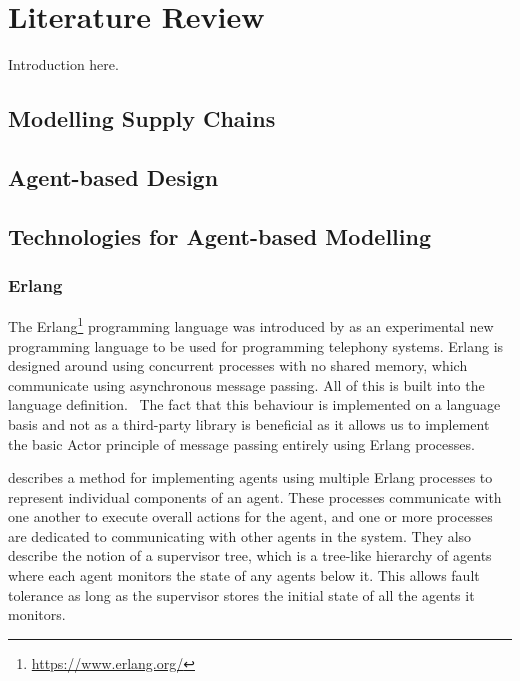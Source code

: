 \section{Literature Review}

Introduction here.

\subsection{Modelling Supply Chains}

\subsection{Agent-based Design}

\subsection{Technologies for Agent-based Modelling}

\subsubsection{Erlang}

The Erlang\footnote{\url{https://www.erlang.org/}} programming language was introduced by  as an experimental new programming language to be used for programming telephony systems.
Erlang is designed around using concurrent processes with no shared memory, which communicate using asynchronous message passing.
All of this is built into the language definition.~\cite{armstrong2007history}
The fact that this behaviour is implemented on a language basis and not as a third-party library is beneficial as it allows us to implement the basic Actor principle of message passing entirely using Erlang processes.

 describes a method for implementing agents using multiple Erlang processes to represent individual components of an agent.
These processes communicate with one another to execute overall actions for the agent, and one or more processes are dedicated to communicating with other agents in the system.
They also describe the notion of a supervisor tree, which is a tree-like hierarchy of agents where each agent monitors the state of any agents below it.
This allows fault tolerance as long as the supervisor stores the initial state of all the agents it monitors.

